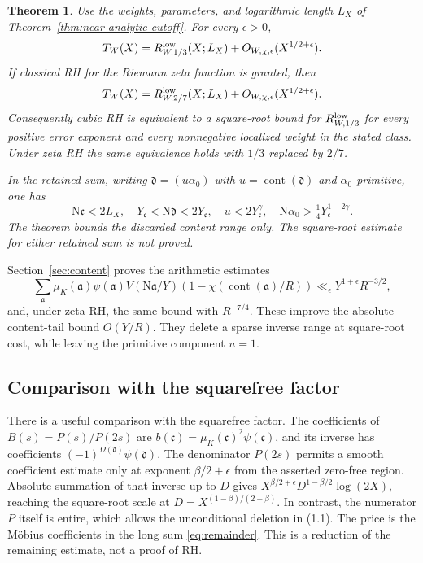 \documentclass[11pt]{article}
\newtheorem{theorem}{Theorem}[section]
\newcommand{\N}{\mathrm N}
\begin{document}
\begin{theorem}\label{thm:content-reduction}
Use the weights, parameters, and logarithmic length $L_X$ of
Theorem~\ref{thm:near-analytic-cutoff}.
For every $\epsilon>0$,
\[
 T_W(X)=R^{\rm low}_{W,1/3}(X;L_X)
                         +O_{W,\chi,\epsilon}(X^{1/2+\epsilon}).
\]
If classical RH for the Riemann zeta function is granted, then
\[
 T_W(X)=R^{\rm low}_{W,2/7}(X;L_X)
                         +O_{W,\chi,\epsilon}(X^{1/2+\epsilon}).
\]
Consequently cubic RH is equivalent to a square-root bound
for $R^{\rm low}_{W,1/3}$ for every positive error exponent and
every nonnegative localized weight in the stated class.
Under zeta RH the same equivalence holds with $1/3$ replaced
by $2/7$.

In the retained sum, writing
$\mathfrak d=(u\alpha_0)$ with $u=\operatorname{cont}(\mathfrak d)$
and $\alpha_0$ primitive, one has
\[
 \N\mathfrak c<2L_X,\quad
 Y_{\mathfrak c}<\N\mathfrak d<2Y_{\mathfrak c},\quad
 u<2Y_{\mathfrak c}^{\gamma},\quad
 \N\alpha_0>\tfrac14Y_{\mathfrak c}^{1-2\gamma}.
\]
The theorem bounds the discarded content range only.
The square-root estimate for either retained sum is not proved.
\end{theorem}

Section~\ref{sec:content} proves the arithmetic estimates
\[
 \sum_{\mathfrak a}\mu_K(\mathfrak a)\psi(\mathfrak a)
 V(\N\mathfrak a/Y)
 (1-\chi(\operatorname{cont}(\mathfrak a)/R))
 \ll_\epsilon Y^{1+\epsilon}R^{-3/2},
\]
and, under zeta RH, the same bound with $R^{-7/4}$.
These improve the absolute content-tail bound $O(Y/R)$.
They delete a sparse inverse range at square-root cost,
while leaving the primitive component $u=1$.


\subsection{Comparison with the squarefree factor}

There is a useful comparison with the squarefree factor.
The coefficients of $B(s)=P(s)/P(2s)$ are
$b(\mathfrak c)=\mu_K(\mathfrak c)^2\psi(\mathfrak c)$, and its inverse
has coefficients $(-1)^{\Omega(\mathfrak d)}\psi(\mathfrak d)$.
The denominator $P(2s)$ permits a smooth coefficient estimate only
at exponent $\beta/2+\epsilon$ from the asserted zero-free region.
Absolute summation of that inverse up to $D$ gives
$X^{\beta/2+\epsilon}D^{1-\beta/2}\log(2X)$, reaching the
square-root scale at $D=X^{(1-\beta)/(2-\beta)}$.
In contrast, the numerator $P$ itself is entire, which allows
the unconditional deletion in (1.1). The price is the
M\"obius coefficients in the long sum \eqref{eq:remainder}.
This is a reduction of the remaining estimate, not a proof of RH.
\end{document}

